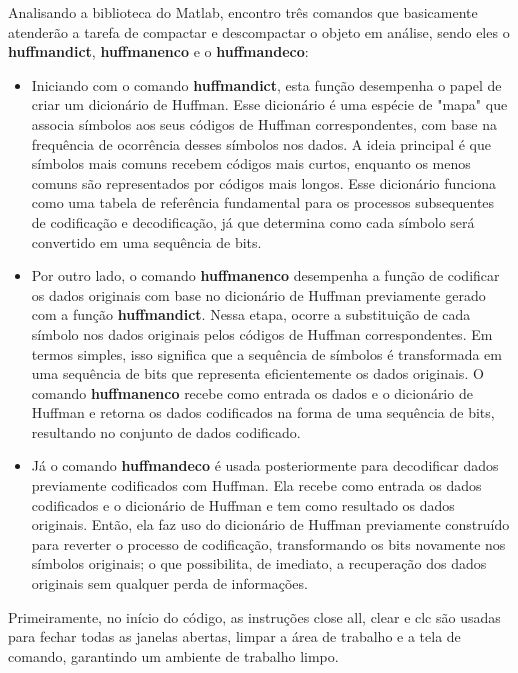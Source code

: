 \documentclass{article}
\begin{document}
Analisando a biblioteca do Matlab, encontro três comandos que basicamente atenderão a tarefa de compactar e descompactar o objeto em análise, sendo eles o \textbf{huffmandict}, \textbf{huffmanenco} e o \textbf{huffmandeco}:

\begin{itemize}
\item Iniciando com o comando \textbf{huffmandict}, esta função desempenha o papel de criar um dicionário de Huffman. Esse dicionário é uma espécie de "mapa" que associa símbolos aos seus códigos de Huffman correspondentes, com base na frequência de ocorrência desses símbolos nos dados. A ideia principal é que símbolos mais comuns recebem códigos mais curtos, enquanto os menos comuns são representados por códigos mais longos. Esse dicionário funciona como uma tabela de referência fundamental para os processos subsequentes de codificação e decodificação, já que determina como cada símbolo será convertido em uma sequência de bits.

\item Por outro lado, o comando \textbf{huffmanenco} desempenha a função de codificar os dados originais com base no dicionário de Huffman previamente gerado com a função \textbf{huffmandict}. Nessa etapa, ocorre a substituição de cada símbolo nos dados originais pelos códigos de Huffman correspondentes. Em termos simples, isso significa que a sequência de símbolos é transformada em uma sequência de bits que representa eficientemente os dados originais. O comando \textbf{huffmanenco} recebe como entrada os dados e o dicionário de Huffman e retorna os dados codificados na forma de uma sequência de bits, resultando no conjunto de dados codificado.

\item Já o comando \textbf{huffmandeco} é usada posteriormente para decodificar dados previamente codificados com Huffman. Ela recebe como entrada os dados codificados e o dicionário de Huffman e tem como resultado os dados originais. Então, ela faz uso do dicionário de Huffman previamente construído para reverter o processo de codificação, transformando os bits novamente nos símbolos originais; o que possibilita, de imediato, a recuperação dos dados originais sem qualquer perda de informações.

\end{itemize}

Primeiramente, no início do código, as instruções close all, clear e clc são usadas para fechar todas as janelas abertas, limpar a área de trabalho e a tela de comando, garantindo um ambiente de trabalho limpo.
\end{document}
